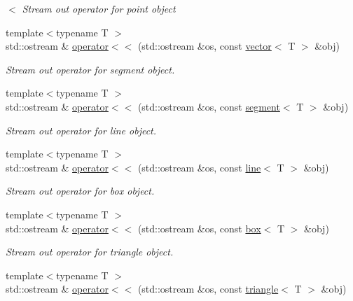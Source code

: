 \begin{DoxyCompactItemize}
\begin{DoxyCompactList}\small\item\em $<$ Stream out operator for point object \end{DoxyCompactList}\item 
{\footnotesize template$<$typename T $>$ }\\std\+::ostream \& \hyperlink{namespaceddd_a85783ffbd6985b1981059732d7bbe174}{operator$<$$<$} (std\+::ostream \&os, const \hyperlink{classddd_1_1vector}{vector}$<$ T $>$ \&obj)
\begin{DoxyCompactList}\small\item\em Stream out operator for segment object. \end{DoxyCompactList}\item 
{\footnotesize template$<$typename T $>$ }\\std\+::ostream \& \hyperlink{namespaceddd_a59e2fa950fd945aa8b3dd550720ad3f5}{operator$<$$<$} (std\+::ostream \&os, const \hyperlink{classddd_1_1segment}{segment}$<$ T $>$ \&obj)
\begin{DoxyCompactList}\small\item\em Stream out operator for line object. \end{DoxyCompactList}\item 
{\footnotesize template$<$typename T $>$ }\\std\+::ostream \& \hyperlink{namespaceddd_a2001eec5d960802592e1ca6a5b0dc203}{operator$<$$<$} (std\+::ostream \&os, const \hyperlink{classddd_1_1line}{line}$<$ T $>$ \&obj)
\begin{DoxyCompactList}\small\item\em Stream out operator for box object. \end{DoxyCompactList}\item 
{\footnotesize template$<$typename T $>$ }\\std\+::ostream \& \hyperlink{namespaceddd_af710b0f11be50190553c743ce86545a3}{operator$<$$<$} (std\+::ostream \&os, const \hyperlink{classddd_1_1box}{box}$<$ T $>$ \&obj)
\begin{DoxyCompactList}\small\item\em Stream out operator for triangle object. \end{DoxyCompactList}\item 
{\footnotesize template$<$typename T $>$ }\\std\+::ostream \& \hyperlink{namespaceddd_a3a6f828f85e4fa306f0d950f1aab4f64}{operator$<$$<$} (std\+::ostream \&os, const \hyperlink{classddd_1_1triangle}{triangle}$<$ T $>$ \&obj)

\end{DoxyCompactItemize}
